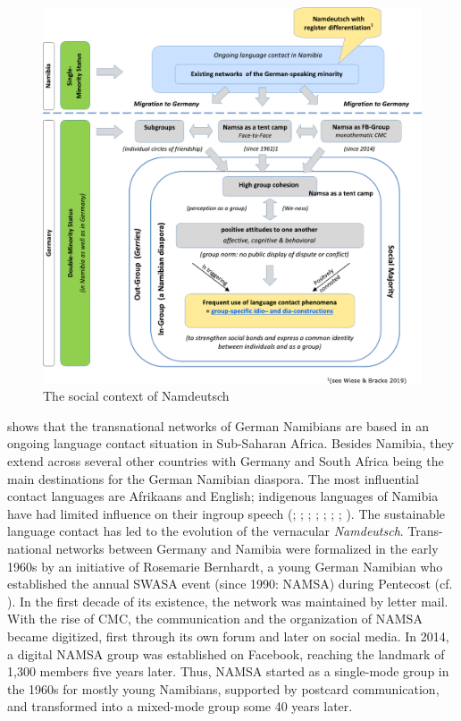 \documentclass[output=paper]{langsci/langscibook}
\begin{document}
\begin{figure}
\includegraphics[width=\textwidth]{figures/radkefig1-carla.pdf}
\caption{The social context of Namdeutsch}
\label{fig:radke:1}
\end{figure}  

\figref{
} shows that the transnational networks of German Namibians are based in an ongoing language contact situation in Sub-Saharan Africa. Besides Namibia, they extend across several other countries with Germany and South Africa being the main destinations for the German Namibian diaspora. The most influential contact languages are Afrikaans and English; indigenous languages of Namibia have had limited influence on their ingroup speech (\citealt{bohm_deutsch_2003}; \citealt{duck_namibia_2018}; \citealt{kellermeier-rehbein_namslang_2015, kellermeier-rehbein_sprache_2016}; \citealt{nockler_sprachmischung_1963}; \citealt{putz_sudwesterdeutsch_1991}; \citealt{wiese_deutsch_2014, wiese_german_2017, wiese_registerdifferenzierung_2021}; \citealt{zimmer_linguisticvar_toappear}; \citealt{zimmer_korpus_2020}). The sustainable language contact has led to the evolution of the vernacular \textit{Namdeutsch}. Trans-national networks between Germany and Namibia were formalized in the early 1960s by an initiative of Rosemarie Bernhardt, a young German Namibian who established the annual SWASA event (since 1990: NAMSA) during Pentecost (cf. \citealt{radke_afrikaans_2019a}). In the first decade of its existence, the network was maintained by letter mail. With the rise of CMC, the communication and the organization of NAMSA became digitized, first through its own forum and later on social media. In 2014, a digital NAMSA group was established on Facebook, reaching the landmark of 1,300 members five years later. Thus, NAMSA started as a single-mode group in the 1960s for mostly young Namibians, supported by postcard communication, and transformed into a mixed-mode group some 40 years later. 
\end{document}
